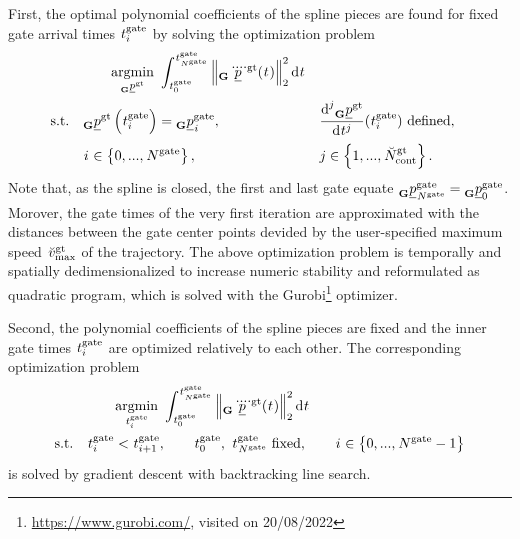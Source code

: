 \begin{itemize}
    First,
    the optimal polynomial coefficients of the spline pieces
    are found for fixed gate arrival times 
    $\timepnt[]{\gate}{i}{}{}$
    by solving the optimization problem
    \begin{align} \label{eq:glo_traj_opt_prob}
        &\qquad \argmin{\pos[]{\glotraj}{}{\grs}{}}
        \int_{\timepnt[]{\gate}{0}{}{}}^{\timepnt[]{\gate}{\num[]{\gate}{}{}{}}{}{}}
            \left\|
                \pos[\ddddot]{\glotraj}{}{\grs}{}(\timepnt[]{}{}{}{})
            \right\|^2_2
        \text d \timepnt[]{}{}{}{}
        \nonumber 
        \\
        \text{s.t.}\quad
        & \pos[]{\glotraj}{}{\grs}{}\left(\timepnt[]{\gate}{i}{}{}\right) = 
            \pos[]{\gate}{\idx[]{}{}{}{}}{\grs}{},
        &&
            \frac{\text d^j \pos[]{\glotraj}{}{\grs}{}}{\text d \timepnt[]{j}{}{}{}} 
            (\timepnt[]{\gate}{i}{}{}) \text{ defined},
        \nonumber \\
        & \idx[]{}{}{}{} \in \left\{0, ..., \num[]{\gate}{}{}{}\right\},
        && j \in \left\{1, ..., \num[\user]{\glotraj}{\text{cont}}{}{}\right\}.
    \end{align}
    Note that, as the spline is closed, 
    the first and last gate equate 
    $\pos[]{\gate}{\num[]{\gate}{}{}{}}{\grs}{} = \pos[]{\gate}{0}{\grs}{}$.
    Morover, the gate times of the very first iteration are 
    approximated with the distances between the gate center points
    devided by the user-specified maximum speed $\speed[\user]{\glotraj}{\mxm}{}{}$ of the trajectory.
    The above optimization problem
    is temporally and spatially dedimensionalized 
    to increase numeric stability and 
    reformulated as quadratic program,
    which is solved with the Gurobi\footnote{
        \url{https://www.gurobi.com/}, visited on 20/08/2022
    } optimizer.

    Second, the polynomial coefficients of the spline pieces 
    are fixed
    and the inner gate times
    $\timepnt[]{\gate}{i}{}{}$
    are optimized relatively to each other.
    The corresponding optimization problem
    \begin{align}
        &\qquad \argmin{\timepnt[]{\gate}{i}{}{}}
        \int_{\timepnt[]{\gate}{0}{}{}}^{\timepnt[]{\gate}{\num[]{\gate}{}{}{}}{}{}}
            \left\|
                \pos[\ddddot]{\glotraj}{}{\grs}{}(\timepnt[]{}{}{}{})
            \right\|^2_2
        \text d \timepnt[]{}{}{}{}
        \nonumber \\
        \text{s.t.}\quad
        & \timepnt[]{\gate}{i}{}{} < \timepnt[]{\gate}{i+1}{}{},
        \qquad
        \timepnt[]{\gate}{0}{}{},\ \timepnt[]{\gate}{\num[]{\gate}{}{}{}}{}{} \text{ fixed},
        \qquad
        \idx[]{}{}{}{} \in \left\{0, ..., \num[]{\gate}{}{}{} - 1 \right\}
    \end{align}
    is solved by gradient descent with backtracking line search.


\end{itemize}

